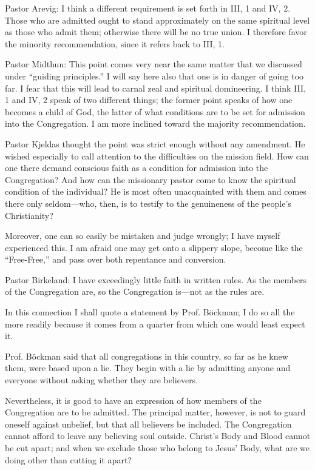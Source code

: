 Pastor Arevig: I think a different requirement is set forth in III, 1 and IV, 2. Those who are admitted ought to stand approximately on the same spiritual level as those who admit them; otherwise there will be no true union. I therefore favor the minority recommendation, since it refers back to III, 1.

Pastor Midthun: This point comes very near the same matter that we discussed under “guiding principles.” I will say here also that one is in danger of going too far. I fear that this will lead to carnal zeal and spiritual domineering. I think III, 1 and IV, 2 speak of two different things; the former point speaks of how one becomes a child of God, the latter of what conditions are to be set for admission into the Congregation. I am more inclined toward the majority recommendation.

Pastor Kjeldas thought the point was strict enough without any amendment. He wished especially to call attention to the difficulties on the mission field. How can one there demand conscious faith as a condition for admission into the Congregation? And how can the missionary pastor come to know the spiritual condition of the individual? He is most often unacquainted with them and comes there only seldom—who, then, is to testify to the genuineness of the people’s Christianity?

Moreover, one can so easily be mistaken and judge wrongly; I have myself experienced this. I am afraid one may get onto a slippery slope, become like the “Free-Free,” and pass over both repentance and conversion.

Pastor Birkeland: I have exceedingly little faith in written rules. As the members of the Congregation are, so the Congregation is—not as the rules are.

In this connection I shall quote a statement by Prof. Böckman; I do so all the more readily because it comes from a quarter from which one would least expect it.

Prof. Böckman said that all congregations in this country, so far as he knew them, were based upon a lie. They begin with a lie by admitting anyone and everyone without asking whether they are believers.

Nevertheless, it is good to have an expression of how members of the Congregation are to be admitted. The principal matter, however, is not to guard oneself against unbelief, but that all believers be included. The Congregation cannot afford to leave any believing soul outside. Christ’s Body and Blood cannot be cut apart; and when we exclude those who belong to Jesus’ Body, what are we doing other than cutting it apart?

